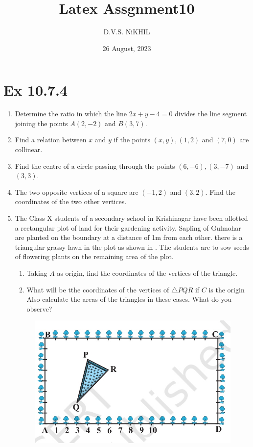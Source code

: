 \documentclass{article}
\theoremstyle{remark}
\begin{document}
\title{Latex Assgnment10}
\author{D.V.S. NiKHIL}
\date{26 August, 2023}
\maketitle
\section*{Ex 10.7.4}
\begin{enumerate}
\item Determine the ratio in which the line $2x+y-4=0$ divides the line segment joining the points $A(2,-2)$  and $B(3,7)$.
\item Find a relation between $x$ and $y$ if the points $(x,y), (1,2)$ and $(7,0)$ are collinear.
\item Find the centre of a circle passing through the points $(6,-6), (3,-7)$ and $(3,3)$.
\item The two opposite vertices of a square are $(-1,2)$ and $(3,2)$. Find the coordinates of the two other vertices.
\item The Class X students of a secondary school in Krishinagar have been allotted a rectangular plot of land for their gardening activity. Sapling of Gulmohar are planted on the boundary at a distance of 1m from each other. there is a triangular grassy lawn in the plot as shown in . The students are to sow seeds of flowering plants on the remaining area of the plot.
\begin{enumerate}[label=(\roman*)]
\item Taking $A$ as origin, find the coordinates of the vertices of the triangle.
\item What will be tthe coordinates of the vertices of $\triangle PQR$ if $C$ is the origin Also calculate the areas of the triangles in these cases. What do you observe?
\end{enumerate}
\begin{figure}[ht]
\centering
\includegraphics[width=\columnwidth]{figs/7.14.png}

\end{figure}
\end{enumerate}
\end{document}
